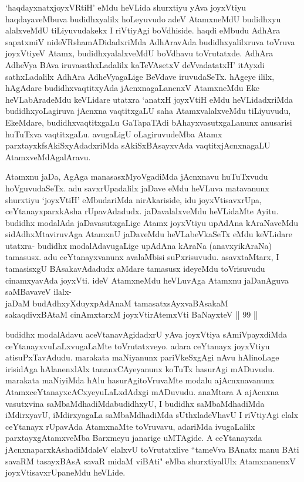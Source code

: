 \begin{artha}
`haqdayxnatxjoyxVRtiH' eMdu heVLida shurxtiyu yAva joyxVtiyu haqdayaveMbuva budidhxyalilx hoLeyuvudo adeV AtamxneMdU budidhxyu alalxveMdU tiLiyuvudakekx I riVtiyAgi boVdhiside. haqdi eMbudu AdhAra sapatxmiV nideVRshamADidadxriMda AdhAravAda budidhxyalilxruva toVruva joyxVtiyeV Atamx, budidhxyalalxveMdU boVdhavu toVrutatxde. AdhAra AdheVya BAva iruvasathxLadalilx kaTeVAsetxV deVvadatatxH' itAyxdi sathxLadalilx AdhAra AdheVyagaLige BeVdave iruvudaSeTx. hAgeye ililx, hAgAdare budidhxvaqtitxyAda jAcnxnagaLanenxV AtamxneMdu Eke heVLabAradeMdu keVLidare utatxra `anatxH joyxVtiH eMdu heVLidadxriMda budidhxyoLagiruva jAcnxna vaqtitxgaLU saha AtamxvalalxveMdu tiLiyuvudu, EkeMdare, budidhxvaqtitxgaLu GaTapaTAdi bAhayxvasutxgaLanunx anusarisi huTuTxva vaqtitxgaLu. avugaLigU oLagiruvudeMba Atamx parxtayxkfsAkiSxyAdadxriMda sAkiSxBAsayxvAda vaqtitxjAcnxnagaLU AtamxveMdAgalAravu. 
\end{artha}


\begin{artha}
Atamxnu jaDa, AgAga manasasxMyoVgadiMda jAcnxnavu huTuTxvudu hoVguvudaSeTx. adu savxrUpadalilx jaDave eMdu heVLuva matavanunx shurxtiyu `joyxVtiH' eMbudariMda nirAkariside, idu joyxVtisavxrUpa, ceYtanayxparxkAsha rUpavAdadudx. jaDavalalxveMdu heVLidaMte Ayitu. budidhx modalAda jaDavasutxgaLige Atamx joyxVtiyu upAdAna kAraNaveMdu sidAdhxMtaviruvAga AtamxnU jaDaveMdu heVLabeVkaSeTx eMdu keVLidare utatxra- budidhx modalAdavugaLige upAdAna kAraNa (anavxyikAraNa) tamasusx. adu ceYtanayxvanunx avalaMbisi suPxrisuvudu. asavxtaMtarx, I tamasisxgU BAsakavAdadudx aMdare tamasusx ideyeMdu toVrisuvudu cinamxyavAda joyxVti. ideV AtamxneMdu heVLuvAga Atamxnu jaDanAguva saMBavaveV ilalx-\\
jaDaM budAdhxyXduyxpAdAnaM tamasatxsAyxvaBAsakaM\\
sakaqdivxBAtaM cinAmxtarxM joyxVtirAtemxVti BaNayxteV || 99 ||
\end{artha}
\newpage
\begin{artha}
budidhx modalAdavu aceVtanavAgidadxrU yAva joyxVtiya sAmiVpayxdiMda ceYtanayxvuLaLxvugaLaMte toVrutatxveyo. adara ceYtanayx joyxVtiyu atisuPxTavAdudu. marakata maNiyanunx pariVkeSxgAgi nAvu hAlinoLage irisidAga hAlanenxlAlx tananxCAyeyanunx koTuTx hasurAgi mADuvudu. marakata maNiyiMda hAlu hasurAgitoVruvaMte modalu ajAcnxnavanunx AtamxceYtanayxcACxyeyuLaLxdAdxgi mADuvudu. anaMtara A ajAcnxna vasutxvina saMbaMdhadiMda\break budidhxyU, I budidhx saMbaMdhadiMda iMdirxyavU, iMdirxyagaLa saMbaMdhadiMda sUthxladeVhavU I riVtiyAgi elalx ceYtanayx rUpavAda AtamxnaMte toVruvavu, adariMda ivugaLalilx parxtayxgAtamxveMba Barxmeyu janarige uMTAgide. A ceYtanayxda jAcnxnaparxkAshadiMdaleV elalxvU toVrutatxlive ``tameVva BAnatx manu BAti savaRM tasayxBAsA savaR midaM viBAti" eMba shurxtiyalUlx AtamxnanenxV joyxVtisavxrUpaneMdu heVLide. 
\end{artha}

